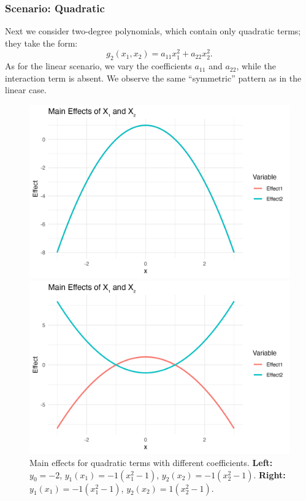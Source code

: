 \subsubsection*{Scenario: Quadratic}
Next we consider two-degree polynomials, which contain only quadratic terms; they take the form: $$g_2(x_1, x_2) = a_{11} x_1^2 + a_{22} x_2^2.$$
As for the linear scenario, we vary the coefficients $a_{11}$ and $a_{22}$, while the interaction term is absent. We observe the same ``symmetric'' pattern as in the linear case.
\begin{figure}[htpb]
    \centering
    \begin{minipage}[t]{0.49\textwidth}
        \centering
        \includegraphics[width=\textwidth]{images/quadratic_a1p00_a2p00_a11m10_a22m10_a12p00_rhop00_main.png}
    \end{minipage}%
    \hfill
    \begin{minipage}[t]{0.49\textwidth}
        \centering
        \includegraphics[width=\textwidth]{images/quadratic_a1p00_a2p00_a11m10_a22p10_a12p00_rhop00_main.png}
    \end{minipage}
    \caption{
        Main effects for quadratic terms with different coefficients. 
        \textbf{Left:} $y_0 = -2$, $y_1(x_1) = -1(x_1^2 - 1)$, $y_2(x_2) = -1(x_2^2 - 1)$. 
        \textbf{Right:} $y_1(x_1) = -1(x_1^2 - 1)$, $y_2(x_2) = 1(x_2^2 - 1)$.
    }
    \label{fig:quadratic_main_effects}
\end{figure}



